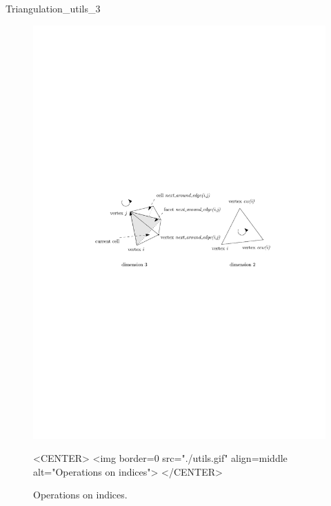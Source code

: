 \begin{ccRefClass}{Triangulation_utils_3}
\begin{figure}[htbp]
\begin{ccTexOnly}
\begin{center} 
\includegraphics{TriangulationDS_3_ref/utils} 
\end{center}
\end{ccTexOnly}
\begin{ccHtmlOnly}
<CENTER>
<img border=0 src="./utils.gif" align=middle alt="Operations on indices">
</CENTER>
\end{ccHtmlOnly}
\caption{Operations on indices.
\label{Triangulation3-fig-utils}}
\end{figure} 

\end{ccRefClass}
